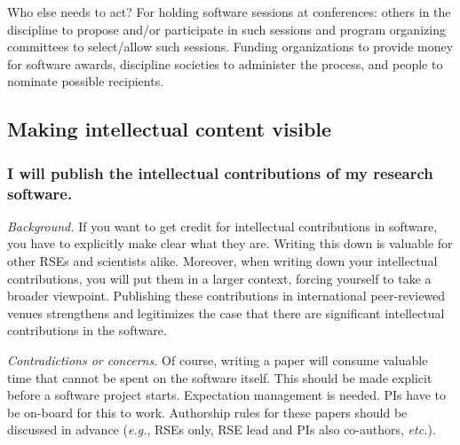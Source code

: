 \documentclass[a4paper,UKenglish]{dagman}
\renewcommand{\paragraph}[1]{\subsubsection*{#1}\xspace}
\newcommand{\eg}{\emph{e.g.},\xspace}
\newcommand{\etc}{\emph{etc.}\xspace}
\begin{document}
Who else needs to act? 
For holding software sessions at conferences: others in the discipline to propose and/or participate in such sessions and program organizing committees to select/allow such sessions. 
Funding organizations to provide money for software awards, discipline societies to administer the process, and people to nominate possible recipients. 

\subsection{Making intellectual content visible}



\paragraph{I will publish the intellectual contributions of my research software.}



\emph{Background.} 
If you want to get credit for intellectual contributions in software, you have to explicitly make clear what they are. Writing this down is valuable for other RSEs and scientists alike. Moreover, when writing down your intellectual contributions, you will put them in a larger context, forcing yourself to take a broader viewpoint. Publishing these contributions in international peer-reviewed venues strengthens and legitimizes the case that there are significant intellectual contributions in the software.


\emph{Contradictions or concerns.}
Of course, writing a paper will consume valuable time that cannot be spent on the software itself. This should be made explicit before a software project starts. Expectation management is needed. PIs have to be on-board for this to work. Authorship rules for these papers should be discussed in advance (\eg RSEs only, RSE lead and PIs also co-authors, \etc).
\end{document}
